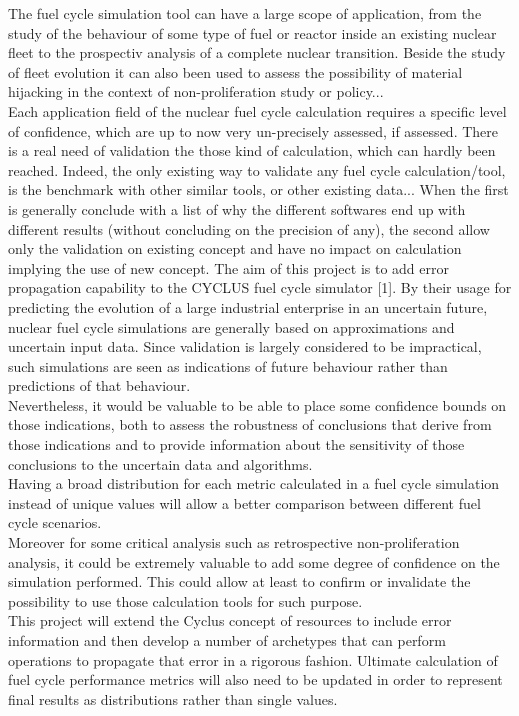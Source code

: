 \documentclass[dvips,12pt]{article}
\begin{document}
The fuel cycle simulation tool can have a large scope of application, from the study of the behaviour of some type of fuel or reactor inside an existing nuclear fleet to the prospectiv analysis of a complete nuclear transition. Beside the study of fleet evolution it can also been used to assess the possibility of material hijacking in the context of non-proliferation study or policy...\\
Each application field of the nuclear fuel cycle calculation requires a specific level of confidence, which are up to now very un-precisely assessed, if assessed. There is a real need of validation the those kind of calculation, which can hardly been reached. Indeed, the only existing way to validate any fuel cycle calculation/tool, is the benchmark with other similar tools, or other existing data... When the first is generally conclude with a list of why the different softwares end up with different results (without concluding on the precision of any), the second allow only the validation on existing concept and have no impact on calculation implying the use of new concept. 
The aim of this project is to add error propagation capability to the CYCLUS fuel cycle simulator [1]. By their usage for predicting the evolution of a large industrial enterprise in an uncertain future, nuclear fuel cycle simulations are generally based on approximations and uncertain input data.  Since validation is largely considered to be impractical, such simulations are seen as indications of future behaviour rather than predictions of that behaviour. \\
Nevertheless, it would be valuable to be able to place some confidence bounds on those indications, both to assess the robustness of conclusions that derive from those indications and to provide information about the sensitivity of those conclusions to the uncertain data and algorithms.\\
Having a broad distribution for each metric calculated in a fuel cycle simulation instead of unique values will allow a better comparison between different fuel cycle scenarios.\\
Moreover for some critical analysis such as retrospective non-proliferation analysis, it could be extremely valuable to add some degree of confidence on the simulation performed. This could allow at least to confirm or invalidate the possibility to use those calculation tools for such purpose.\\
This project will extend the Cyclus concept of resources to include error information and then develop a number of archetypes that can perform operations to propagate that error in a rigorous fashion.  Ultimate calculation of fuel cycle performance metrics will also need to be updated in order to represent final results as distributions rather than single values. 
\end{document}
